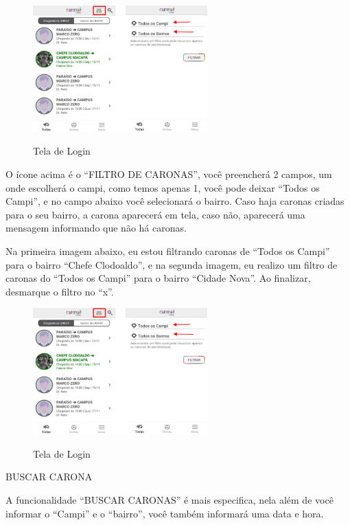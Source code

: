 \begin{figure}[H]
	\centering
	\caption{Tela de Login}
	\includegraphics[width=0.6\textwidth]{./04-figuras/manual/filtrar_carona.png}
	\label{fig:filtrar_carona}
\end{figure}

O ícone acima é o “FILTRO DE CARONAS”, você preencherá 2 campos, um onde escolherá o campi, como temos apenas 1, você pode deixar “Todos os Campi”, e no campo abaixo você selecionará o bairro. Caso haja caronas criadas para o seu bairro, a carona aparecerá em tela, caso não, aparecerá uma mensagem informando que não há caronas.

Na primeira imagem abaixo, eu estou filtrando caronas de “Todos os Campi” para o bairro “Chefe Clodoaldo”, e na segunda imagem, eu realizo um filtro de caronas do “Todos os Campi” para o bairro “Cidade Nova”. Ao finalizar, desmarque o filtro no “x”.

\begin{figure}[H]
	\centering
	\caption{Tela de Login}
	\includegraphics[width=0.6\textwidth]{./04-figuras/manual/filtrar_carona.png}
	\label{fig:filtrar_carona_2}
\end{figure}

BUSCAR CARONA

A funcionalidade “BUSCAR CARONAS” é mais especifica, nela além de você informar o “Campi” e o “bairro”, você também informará uma data e hora.

